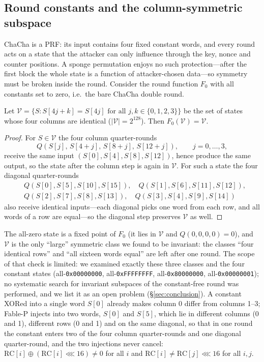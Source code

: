 \documentclass{iacrtrans}
\newcommand{\FableP}{\textsf{Fable-P}\xspace}
\newcommand{\ChaCha}{\textsf{ChaCha}\xspace}
\newcommand{\rotl}{\lll}
\begin{document}
\subsection{Round constants and the column-symmetric subspace}
\label{sec:constants}
\ChaCha is a PRF: its input contains four fixed constant words, and every round acts on a state that the attacker can only influence through the key, nonce and counter positions. A sponge permutation enjoys no such protection---after the first block the whole state is a function of attacker-chosen data---so symmetry must be broken inside the round. Consider the round function $F_0$ with all constants set to zero, i.e.\ the bare \ChaCha double round.

\begin{lemma}
Let $\mathcal{V} = \{S : S[4j+k] = S[4j] \text{ for all } j,k \in \{0,1,2,3\}\}$ be the set of states whose four columns are identical ($|\mathcal{V}| = 2^{128}$). Then $F_0(\mathcal{V}) = \mathcal{V}$.
\end{lemma}
\begin{proof}
For $S \in \mathcal{V}$ the four column quarter-rounds
\[
Q(S[j],\,S[4{+}j],\,S[8{+}j],\,S[12{+}j]),\qquad j = 0,\ldots,3,
\]
receive the same input $(S[0],S[4],S[8],S[12])$, hence produce the same output, so the state after the column step is again in $\mathcal{V}$. For such a state the four diagonal quarter-rounds
\begin{align*}
&Q(S[0],S[5],S[10],S[15]),\quad Q(S[1],S[6],S[11],S[12]),\\
&Q(S[2],S[7],S[8],S[13]),\quad Q(S[3],S[4],S[9],S[14])
\end{align*}
also receive identical inputs---each diagonal picks one word from each row, and all words of a row are equal---so the diagonal step preserves $\mathcal{V}$ as well.
\end{proof}

The all-zero state is a fixed point of $F_0$ (it lies in $\mathcal{V}$ and $Q(0,0,0,0) = 0$), and $\mathcal{V}$ is the only ``large'' symmetric class we found to be invariant: the classes ``four identical rows'' and ``all sixteen words equal'' are left after one round. The scope of that check is limited: we examined exactly these three classes and the four constant states (all-\texttt{0x00000000}, all-\texttt{0xFFFFFFFF}, all-\texttt{0x80000000}, all-\texttt{0x00000001}); no systematic search for invariant subspaces of the constant-free round was performed, and we list it as an open problem (\S\ref{sec:conclusion}). A constant XORed into a single word $S[0]$ already makes column 0 differ from columns 1--3; \FableP injects into two words, $S[0]$ and $S[5]$, which lie in different columns (0 and 1), different rows (0 and 1) and on the same diagonal, so that in one round the constant enters two of the four column quarter-rounds and one diagonal quarter-round, and the two injections never cancel: $\mathrm{RC}[i] \oplus (\mathrm{RC}[i] \rotl 16) \neq 0$ for all $i$ and $\mathrm{RC}[i] \neq \mathrm{RC}[j] \rotl 16$ for all $i,j$.
\end{document}
